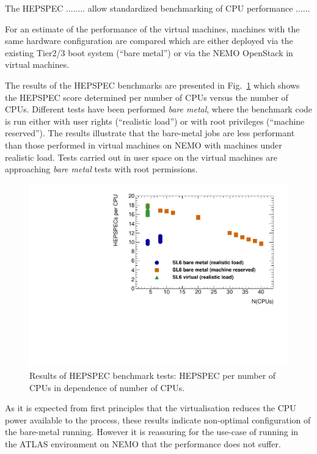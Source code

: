 The HEPSPEC ........ allow standardized benchmarking of CPU
performance ......

For an estimate of the performance of the virtual machines, machines
with the same hardware configuration are compared which are either
deployed via the existing Tier2/3 boot system (``bare metal'') or via the NEMO
OpenStack in virtual machines.

The results of the HEPSPEC benchmarks are presented in
Fig.~\ref{fig:HEPSPECpCPUvsCPU-atlas} which shows the HEPSPEC score
determined per number of CPUs versus the number of CPUs.
Different tests have been performed \textit{bare metal}, where the
benchmark code is run either with user rights (``realistic load'') or
with root privileges (``machine reserved'').
The results illustrate that the bare-metal jobs are less performant
than those performed in virtual machines on NEMO with machines under
realistic load. Tests carried out
in user space on the virtual machines are approaching \textit{bare metal} tests with
root permissions.


\begin{figure}[htbp]
  \includegraphics[width=\columnwidth]{figures/HEPSPECpCPUvsCPU.pdf}
\caption{Results of HEPSPEC benchmark tests: HEPSPEC per number of
  CPUs in dependence of number of CPUs.}
\label{fig:HEPSPECpCPUvsCPU-atlas}
\end{figure}

As it is expected from first principles that the virtualisation
reduces the CPU power available to the process, these results indicate
non-optimal configuration of the bare-metal running. However it is
reassuring for the use-case of running in the ATLAS environment on
NEMO that the performance does not suffer.



%
%